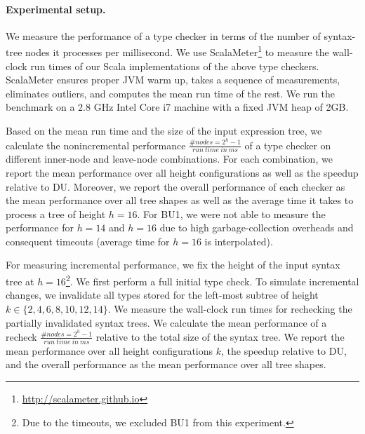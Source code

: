 \documentclass{llncs}
\begin{document}
\paragraph{Experimental setup.} We measure the performance of a type checker in terms
of the number of syntax-tree nodes it processes per millisecond. We use
ScalaMeter\footnote{\url{http://scalameter.github.io}} to measure the wall-clock
run times of our Scala implementations of the above type checkers. ScalaMeter
ensures proper JVM warm up, takes a sequence of measurements, eliminates
outliers, and computes the mean run time of the rest. We run the benchmark on a
2.8 GHz Intel Core i7 machine with a fixed JVM heap of 2GB.

Based on the mean run time and the size of the input expression tree, we
calculate the nonincremental performance
$\frac{\#\mathit{nodes}=2^h-1}{\mathit{run\ time\ in\ ms}}$ of a type checker on
different inner-node and leave-node combinations. For each combination, we
report the mean performance over all height configurations as well as the
speedup relative to DU. Moreover, we report the overall performance of each
checker as the mean performance over all tree shapes as well as the average time
it takes to process a tree of height $h = 16$. For BU1, we were not able to
measure the performance for $h = 14$ and $h = 16$ due to high garbage-collection
overheads and consequent timeouts (average time for $h=16$ is interpolated).

For measuring incremental performance, we fix the height of the input syntax
tree at $h = 16$\footnote{Due to the
timeouts, we excluded BU1 from this experiment.}. We first perform a full initial type check. 
To simulate incremental changes,
we invalidate all types stored for the left-most subtree of height $k \in
\{2,4,6,8,10,12,14\}$. We measure the wall-clock run times for rechecking the
partially invalidated syntax trees. We calculate the mean performance of a
recheck $\frac{\#\mathit{nodes}=2^{h}-1}{\mathit{run\ time\ in\ ms}}$ relative
to the total size of the syntax tree. We report the mean performance over all
height configurations $k$, the speedup relative to DU, and the overall
performance as the mean performance over all tree shapes.
\end{document}
